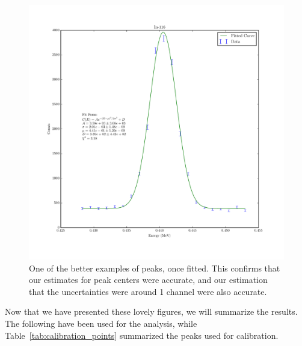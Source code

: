 \documentclass[reprint, nobibnotes, amssymb, amsmath, amsfonts, physics, mathtools, mathrsfs, floatfix]{revtex4-1}
\begin{document}
      \begin{figure}[h]
        \centering
        \includegraphics[width=\linewidth]{../plots/In-116_0_4405.pdf}
        \caption{One of the better examples of peaks, once fitted.  This confirms that our estimates for peak centers were accurate, and our estimation that the uncertainties were around 1 channel were also accurate. \label{fig:fitted_in}}
      \end{figure}

      Now that we have presented these lovely figures, we will summarize the results.  The following have been used for the analysis, while Table~\ref{tab:calibration_points} summarized the peaks used for calibration.
\end{document}
